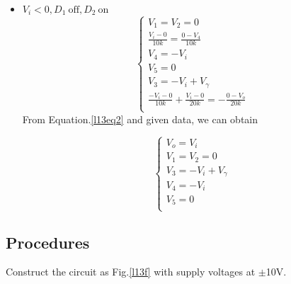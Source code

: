 \begin{itemize}
        \item $V_i < 0, D_1~\text{off}, D_2~\text{on}$
            \begin{equation}
                \begin{cases}
                    V_1=V_2=0\\
                    \frac{V_i-0}{10k}=\frac{0-V_4}{10k}\\
                    V_4=-V_i\\
                    V_5=0\\
                    V_3=-V_i+V_\gamma\\
                    \frac{-V_i-0}{10k}+\frac{V_i-0}{20k}=-\frac{0-V_o}{20k}\\
                \end{cases}
                \label{l13eq2}
            \end{equation}
            From Equation.\ref{l13eq2} and given data, we can obtain\par
            \begin{equation*}
                \begin{cases}
                V_o=V_i\\
                V_1=V_2=0\\
                V_3=-V_i+V_\gamma\\
                V_4=-V_i\\
                V_5=0\\
                \end{cases}
            \end{equation*}
    \end{itemize}

    \subsection{Procedures}
    Construct the circuit as Fig.\ref{l13f} with supply voltages at $\pm$10V.
